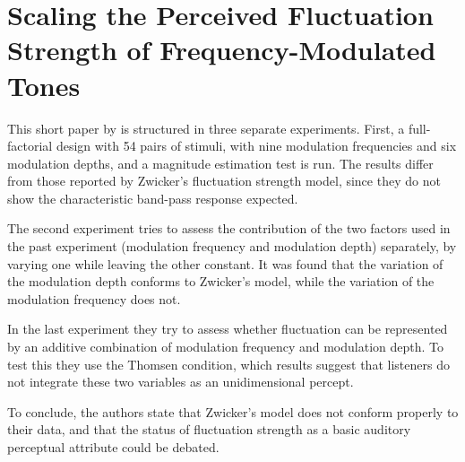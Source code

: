\section{Scaling the Perceived Fluctuation Strength of Frequency-Modulated
    Tones}

This short paper by \citet{Wickelmaier2004Scaling} is structured in three
separate experiments. First, a full-factorial design with 54 pairs of stimuli,
with nine modulation frequencies and six modulation depths, and a magnitude
estimation test is run. The results differ from those reported by Zwicker's
fluctuation strength model, since they do not show the characteristic band-pass
response expected.

The second experiment tries to assess the contribution of the two factors used
in the past experiment (modulation frequency and modulation depth) separately,
by varying one while leaving the other constant. It was found that the variation
of the modulation depth conforms to Zwicker's model, while the variation of the
modulation frequency does not.

In the last experiment they try to assess whether fluctuation can be
represented by an additive combination of modulation frequency and modulation
depth. To test this they use the Thomsen condition, which results suggest that
listeners do not integrate these two variables as an unidimensional percept.

To conclude, the authors state that Zwicker's model does not conform properly
to their data, and that the status of fluctuation strength as a basic auditory
perceptual attribute could be debated.
